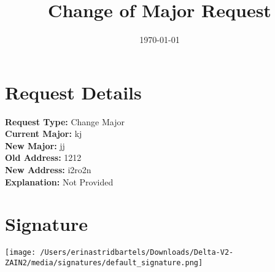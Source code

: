 \documentclass{article}
\begin{document}
\title{Change of Major Request}
\date{\today}

\maketitle



\section*{Request Details}
\textbf{Request Type:} Change Major \\
\textbf{Current Major:} kj \\
\textbf{New Major:} jj \\
\textbf{Old Address:} 1212 \\
\textbf{New Address:} i2ro2n \\
\textbf{Explanation:} Not Provided

\section*{Signature}
\vspace{1cm}
\texttt{[image: /Users/erinastridbartels/Downloads/Delta-V2-ZAIN2/media/signatures/default\_signature.png]} %
\end{document}
